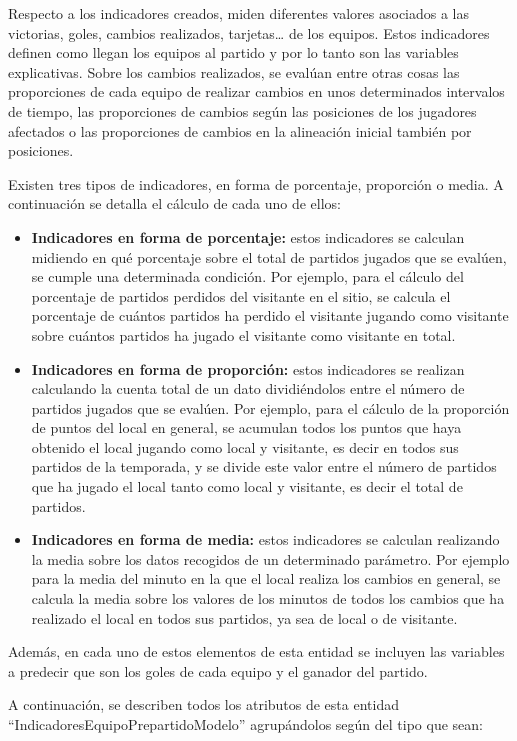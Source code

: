 Respecto a los indicadores creados, miden diferentes valores asociados a las victorias, goles,
cambios realizados, tarjetas… de los equipos. Estos indicadores definen como llegan los equipos
al partido y por lo tanto son las variables explicativas. Sobre los cambios realizados, se evalúan
entre otras cosas las proporciones de cada equipo de realizar cambios en unos determinados
intervalos de tiempo, las proporciones de cambios según las posiciones de los jugadores afectados
o las proporciones de cambios en la alineación inicial también por posiciones.

Existen tres tipos de indicadores, en forma de porcentaje, proporción o media. A continuación se detalla el cálculo de cada uno de ellos:
\begin{itemize}
    \item \textbf{Indicadores en forma de porcentaje:} estos indicadores se calculan midiendo en qué porcentaje sobre el total de partidos jugados que se evalúen, se cumple una determinada condición. Por ejemplo, para el cálculo del porcentaje de partidos perdidos del visitante en el sitio, se calcula el porcentaje de cuántos partidos ha perdido el visitante jugando como visitante sobre cuántos partidos ha jugado el visitante como visitante en total.
    \item \textbf{Indicadores en forma de proporción:} estos indicadores se realizan calculando la cuenta total de un dato dividiéndolos entre el número de partidos jugados que se evalúen. Por ejemplo, para el cálculo de la proporción de puntos del local en general, se acumulan todos los puntos que haya obtenido el local jugando como local y visitante, es decir en todos sus partidos de la temporada, y se divide este valor entre el número de partidos que ha jugado el local tanto como local y visitante, es decir el total de partidos.
    \item \textbf{Indicadores en forma de media:} estos indicadores se calculan realizando la media sobre los datos recogidos de un determinado parámetro. Por ejemplo para la media del minuto en la que el local realiza los cambios en general, se calcula la media sobre los valores de los minutos de todos los cambios que ha realizado el local en todos sus partidos, ya sea de local o de visitante.
\end{itemize}


Además, en cada uno de estos elementos de esta entidad se incluyen las variables a predecir que
son los goles de cada equipo y el ganador del partido.

A continuación, se describen todos los atributos de esta entidad ``IndicadoresEquipoPrepartidoModelo'' agrupándolos según del tipo que sean:

